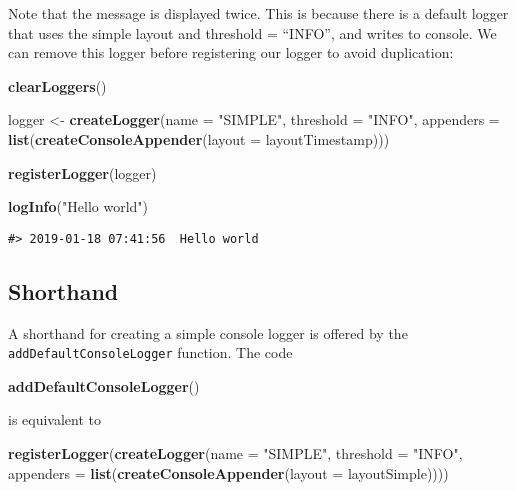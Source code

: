 \documentclass[]{article}
\newenvironment{Shaded}{\begin{snugshade}}{\end{snugshade}}
\newcommand{\DataTypeTok}[1]{\textcolor[rgb]{0.13,0.29,0.53}{#1}}
\newcommand{\KeywordTok}[1]{\textcolor[rgb]{0.13,0.29,0.53}{\textbf{#1}}}
\newcommand{\NormalTok}[1]{#1}
\newcommand{\StringTok}[1]{\textcolor[rgb]{0.31,0.60,0.02}{#1}}
\begin{document}
Note that the message is displayed twice. This is because there is a
default logger that uses the simple layout and threshold = ``INFO'', and
writes to console. We can remove this logger before registering our
logger to avoid duplication:

\begin{Shaded}
\begin{Highlighting}[]
\KeywordTok{clearLoggers}\NormalTok{()}

\NormalTok{logger <-}\StringTok{ }\KeywordTok{createLogger}\NormalTok{(}\DataTypeTok{name =} \StringTok{"SIMPLE"}\NormalTok{,}
                       \DataTypeTok{threshold =} \StringTok{"INFO"}\NormalTok{,}
                       \DataTypeTok{appenders =} \KeywordTok{list}\NormalTok{(}\KeywordTok{createConsoleAppender}\NormalTok{(}\DataTypeTok{layout =}\NormalTok{ layoutTimestamp)))}

\KeywordTok{registerLogger}\NormalTok{(logger)}

\KeywordTok{logInfo}\NormalTok{(}\StringTok{"Hello world"}\NormalTok{)}
\end{Highlighting}
\end{Shaded}

\begin{verbatim}
#> 2019-01-18 07:41:56  Hello world
\end{verbatim}

\hypertarget{shorthand}{%
\subsection{Shorthand}\label{shorthand}}

A shorthand for creating a simple console logger is offered by the
\texttt{addDefaultConsoleLogger} function. The code

\begin{Shaded}
\begin{Highlighting}[]
\KeywordTok{addDefaultConsoleLogger}\NormalTok{()}
\end{Highlighting}
\end{Shaded}

is equivalent to

\begin{Shaded}
\begin{Highlighting}[]
\KeywordTok{registerLogger}\NormalTok{(}\KeywordTok{createLogger}\NormalTok{(}\DataTypeTok{name =} \StringTok{"SIMPLE"}\NormalTok{,}
                            \DataTypeTok{threshold =} \StringTok{"INFO"}\NormalTok{, }
                            \DataTypeTok{appenders =} \KeywordTok{list}\NormalTok{(}\KeywordTok{createConsoleAppender}\NormalTok{(}\DataTypeTok{layout =}\NormalTok{ layoutSimple))))}
\end{Highlighting}
\end{Shaded}
\end{document}
